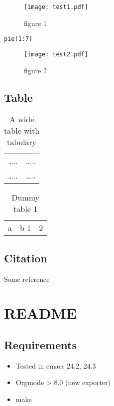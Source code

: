 \documentclass{nusthesis}
\begin{document}
\begin{figure}[htb]
\centering
\texttt{[image: test1.pdf]}
\caption{figure 1}
\end{figure}

\begin{lstlisting}
pie(1:7)
\end{lstlisting}

\begin{figure}[htb]
\centering
\texttt{[image: test2.pdf]}
\caption{figure 2}
\end{figure}
\section{Table}
\label{sec-1-2}
\begin{table}[htb]
\caption{\label{tbl:wide}A wide table with tabulary}
\centering
\begin{tabular}{ll}
\ldots{}.. & \ldots{}..\\
\ldots{}.. & \ldots{}..\\
\end{tabular}
\end{table}

\begin{table}[ht]
\caption{Dummy table 1}
\begin{center}
\begin{tabular}{|c|c|}
a & b
1 & 2
\end{tabular}
\end{center}
\label{tab:dum1}
\end{table}

\section{Citation}
\label{sec-1-3}
Some reference \cite{pmid23396134}

\chapter{README}
\label{sec-2}
\section{Requirements}
\label{sec-2-1}
\begin{itemize}
\item Tested in emacs 24.2, 24.3
\item Orgmode > 8.0 (new exporter)
\item make
\end{itemize}
\end{document}
